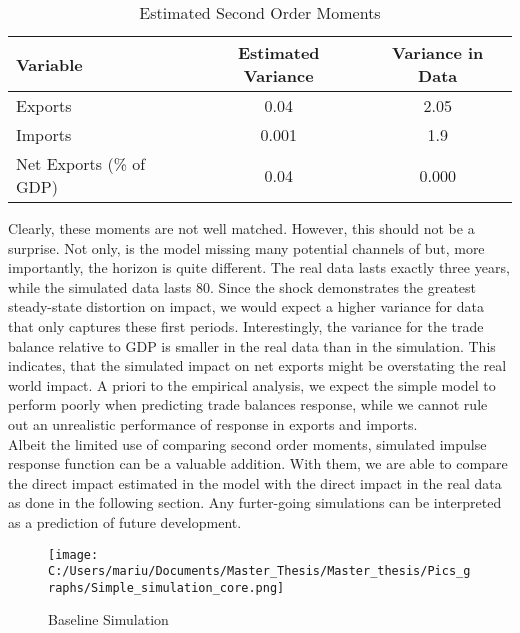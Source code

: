 \documentclass{article}
\begin{document}
\begin{table}[htbp]\centering \caption{Estimated Second Order Moments \label{Estimated Second Order Moments}}
\begin{tabular}{l c c}\hline\hline
Variable & Estimated Variance & Variance in Data\\ \hline
Exports & 0.04 & 2.05 \\
Imports & 0.001 & 1.9 \\
Net Exports (\% of GDP) & 0.04 & 0.000 \\ \hline
\end{tabular}
\end{table}

Clearly, these moments are not well matched. However, this should not be a surprise. Not only, is the model missing many potential channels of but, more importantly, the horizon is quite different. The real data lasts exactly three years, while the simulated data lasts 80. Since the shock demonstrates the greatest steady-state distortion on impact, we would expect a higher variance for data that only captures these first periods. Interestingly, the variance for the trade balance relative to GDP is smaller in the real data than in the simulation. This indicates, that the simulated impact on net exports might be overstating the real world impact. A priori to the empirical analysis, we expect the simple model to perform poorly when predicting trade balances response, while we cannot rule out an unrealistic performance of response in exports and imports. \\
Albeit the limited use of comparing second order moments, simulated impulse response function can be a valuable addition. With them, we are able to compare the direct impact estimated in the model with the direct impact in the real data as done in the following section. Any furter-going simulations can be interpreted as a prediction of future development.\\

\begin{figure}[!ht]
\begin{center}\caption{Baseline Simulation \label{Baseline Simulation}}
\texttt{[image: C:/Users/mariu/Documents/Master\_Thesis/Master\_thesis/Pics\_graphs/Simple\_simulation\_core.png]}\\
\end{center}
\end{figure}
\end{document}
